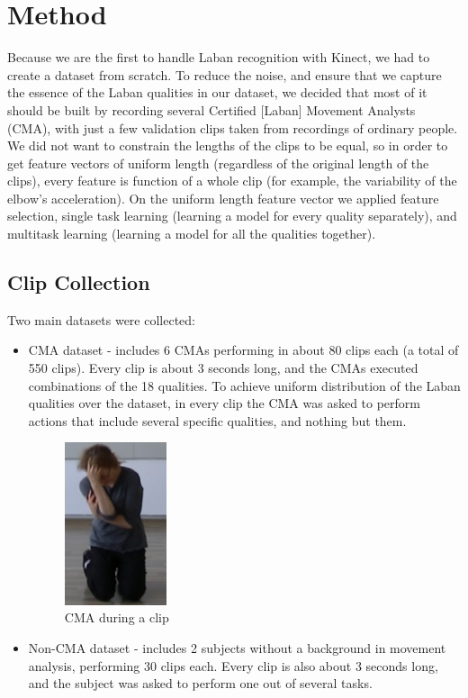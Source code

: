 \documentclass[journal]{journal}
\begin{document}
\section{Method}
Because we are the first to handle Laban recognition with
Kinect, we had to create a dataset from scratch. To reduce the noise, and ensure that we capture the essence of the Laban qualities in our dataset, we decided that most of it should be built by recording several Certified [Laban] Movement Analysts (CMA), with just a few validation clips taken from recordings of ordinary people. We did not want to constrain the lengths of the clips to be equal, so in order to get feature vectors of uniform length (regardless of the original length of the clips),
every feature is function of a whole clip (for example, the variability of the
elbow's acceleration). On the uniform length feature vector we applied feature
selection, single task learning (learning a model for every quality separately),
and multitask learning (learning a model for all the qualities together).
\subsection{Clip Collection}
Two main datasets were collected: 
\begin{itemize}
  	\item 
	 CMA dataset - includes 6 CMAs performing in about
	80 clips each (a total of 550 clips). Every clip is about 3 seconds long, and the CMAs executed combinations of the 18 qualities. 
	To achieve uniform distribution of the Laban qualities over the dataset, in every 
	clip the CMA was asked to perform actions that include several specific qualities, 
	and nothing but them.
	
	\begin{figure}[h]
	\centering
	\includegraphics[width=30mm]{Rachelle.png}
	\caption{CMA during a clip}
	\label{Rachelle}
	\end{figure}
	
	\item 
	Non-CMA dataset - includes 2 subjects without a background in movement
	analysis, performing 30 clips each. Every clip is also about 3 seconds long,
	and the subject was asked to perform one out of several
	tasks.
\end{itemize}
\end{document}
